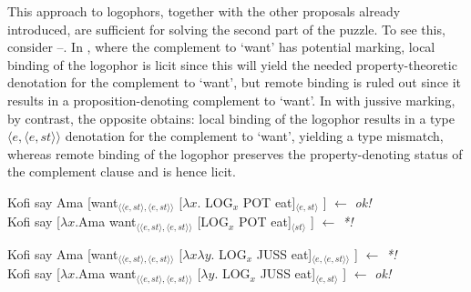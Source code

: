 \documentclass[output=paper,modfonts,nonflat]{langsci/langscibook}
\newcommand{\á}{\'{ã}}
\newcommand{\É}{\'{\~{ε}}}
\newcommand{\È}{\`{\~{ε}}}
\newcommand{\í}{\'{\~{i}}}
\newcommand{\ì}{\`{\~{i}}}
\newcommand{\Ó}{\'{\~{ɔ}}}
\newcommand{\Ò}{\`{\~{ɔ}}}
\newcommand{\ú}{\'{ũ}}
\newcommand{\ù}{\`{ũ}}
\begin{document}
This approach to logophors, together with the other proposals already introduced, are sufficient for solving the second part of the puzzle. To see this, consider --. In , where the complement to `want' has potential marking, local binding of the logophor is licit since this will yield the needed property-theoretic denotation for the complement to `want', but remote binding is ruled out since it results in a proposition-denoting complement to `want'. In  with jussive marking, by contrast, the opposite obtains: local binding of the logophor results in a type $\langle e,\langle e,st\rangle\rangle$ denotation for the complement to `want', yielding a type mismatch, whereas remote binding of the logophor preserves the property-denoting status of the complement clause and is hence licit. 


\ea  \label{ex:grano:local:31}
    \begin{xlist}
    \ex Kofi  say Ama [want$_{\langle\langle e,st\rangle,\langle e,st\rangle\rangle}$ [$\lambda x$. LOG$_{x}$ POT eat]$_{\langle e,st\rangle}$ ] \hfill $\leftarrow$ \emph{ok!}\\
    \ex Kofi  say [$\lambda x$.Ama want$_{\langle\langle e,st\rangle,\langle e,st\rangle\rangle}$ [LOG$_{x}$ POT eat]$_{\langle st\rangle}$ ] \hfill $\leftarrow$ \emph{*!} 
    \end{xlist}
\z

\ea  \label{ex:grano:remote:32}
    \begin{xlist}
    \ex Kofi  say Ama [want$_{\langle\langle e,st\rangle,\langle e,st\rangle\rangle}$ [$\lambda x\lambda y$. LOG$_{x}$ JUSS eat]$_{\langle e,\langle e,st\rangle\rangle}$ ] \hfill $\leftarrow$ \emph{*!}\\
    \ex Kofi  say [$\lambda x$.Ama want$_{\langle\langle e,st\rangle,\langle e,st\rangle\rangle}$ [$\lambda y$. LOG$_{x}$ JUSS eat]$_{\langle e,st\rangle}$ ] \hfill $\leftarrow$ \emph{ok!} 
    \end{xlist}
\z
\end{document}
